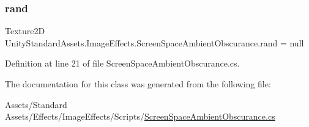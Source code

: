 \subsubsection{\texorpdfstring{rand}{rand}}
{\footnotesize\ttfamily Texture2D Unity\+Standard\+Assets.\+Image\+Effects.\+Screen\+Space\+Ambient\+Obscurance.\+rand = null}



Definition at line 21 of file Screen\+Space\+Ambient\+Obscurance.\+cs.



The documentation for this class was generated from the following file\+:\begin{DoxyCompactItemize}
\item 
Assets/\+Standard Assets/\+Effects/\+Image\+Effects/\+Scripts/\mbox{\hyperlink{_screen_space_ambient_obscurance_8cs}{Screen\+Space\+Ambient\+Obscurance.\+cs}}\end{DoxyCompactItemize}
